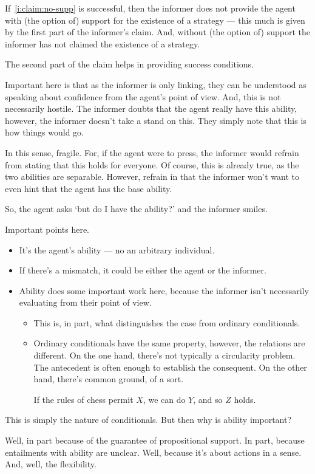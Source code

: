 \documentclass[10pt]{article}
\begin{document}
If~\ref{i:claim:no-supp} is successful, then the informer does not provide the agent with (the option of) support for the existence of a strategy --- this much is given by the first part of the informer's claim.
And, without (the option of) support the informer has not claimed the existence of a strategy.

The second part of the claim helps in providing success conditions.

{
  \color{red}
  Important here is that as the informer is only linking, they can be understood as speaking about confidence from the agent's point of view.
  And, this is not necessarily hostile.
  The informer doubts that the agent really have this ability, however, the informer doesn't take a stand on this.
  They simply note that this is how things would go.

  In this sense, fragile.
  For, if the agent were to press, the informer would refrain from stating that this holds for everyone.
  Of course, this is already true, as the two abilities are separable.
  However, refrain in that the informer won't want to even hint that the agent has the base ability.

  So, the agent asks `but do I have the ability?' and the informer smiles.
}

Important points here.

\begin{itemize}
\item It's the agent's ability --- no an arbitrary individual.
\item If there's a mismatch, it could be either the agent or the informer.
\item Ability does some important work here, because the informer isn't necessarily evaluating from their point of view.
  \begin{itemize}
  \item This is, in part, what distinguishes the case from ordinary conditionals.
  \item Ordinary conditionals have the same property, however, the relations are different.
    On the one hand, there's not typically a circularity problem.
    The antecedent is often enough to establish the consequent.
    On the other hand, there's common ground, of a sort.

    If the rules of chess permit \(X\), we can do \(Y\), and so \(Z\) holds.
  \end{itemize}
\end{itemize}

\begin{note}[No magic]
  This is simply the nature of conditionals.
  But then why is ability important?

  Well, in part because of the guarantee of propositional support.
  In part, because entailments with ability are unclear.
  Well, because it's about actions in a sense.
  And, well, the flexibility.
\end{note}
\end{document}
